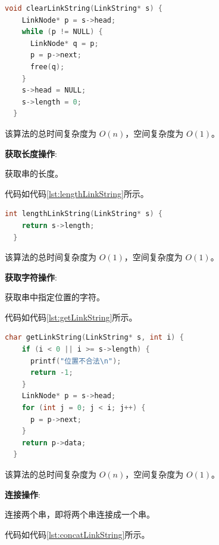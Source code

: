 \documentclass[lang=cn,newtx,10pt,scheme=chinese]{../elegantbook}
\begin{document}
\begin{lstlisting}[language=C++, caption={清空串示例代码}, label={lst:clearLinkString}]
  void clearLinkString(LinkString* s) {
    LinkNode* p = s->head;
    while (p != NULL) {
      LinkNode* q = p;
      p = p->next;
      free(q);
    }
    s->head = NULL;
    s->length = 0;
  }

\end{lstlisting}

该算法的总时间复杂度为 $O(n)$，空间复杂度为 $O(1)$。


\textbf{获取长度操作}:

获取串的长度。

代码如代码\ref{lst:lengthLinkString}所示。

\begin{lstlisting}[language=C++, caption={获取串的长度示例代码}, label={lst:lengthLinkString}]
  int lengthLinkString(LinkString* s) {
    return s->length;
  }

\end{lstlisting}

该算法的总时间复杂度为 $O(1)$，空间复杂度为 $O(1)$。


\textbf{获取字符操作}:

获取串中指定位置的字符。

代码如代码\ref{lst:getLinkString}所示。

\begin{lstlisting}[language=C++, caption={获取串中指定位置的字符示例代码}, label={lst:getLinkString}]
  char getLinkString(LinkString* s, int i) {
    if (i < 0 || i >= s->length) {
      printf("位置不合法\n");
      return -1;
    }
    LinkNode* p = s->head;
    for (int j = 0; j < i; j++) {
      p = p->next;
    }
    return p->data;
  }

\end{lstlisting}

该算法的总时间复杂度为 $O(n)$，空间复杂度为 $O(1)$。


\textbf{连接操作}:

连接两个串，即将两个串连接成一个串。

代码如代码\ref{lst:concatLinkString}所示。
\end{document}
